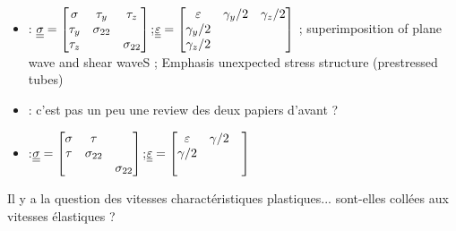 \begin{itemize}
\item \cite{Ting69}:  ${\underline{\underline{\sigma}}}=\left[\begin{matrix}\sigma & \tau_y & \tau_z\\ \tau_y & \sigma_{22} & \\\tau_z & & \sigma_{22}\end{matrix}\right]$;${\underline{\underline{\varepsilon}}}=\left[\begin{matrix}\varepsilon & \gamma_y/2 & \gamma_z/2\\ \gamma_y/2 &  & \\ \gamma_z/2& & \end{matrix}\right]$ ; superimposition of plane wave and shear waveS ; Emphasis unexpected stress structure (prestressed tubes)
\item \cite{Ting73}: c'est pas un peu une review des deux papiers d'avant ?
\item \cite{Li_planeStress_EP}:${\underline{\underline{\sigma}}}=\left[\begin{matrix}\sigma & \tau & \\ \tau & \sigma_{22} & \\ & & \sigma_{22}\end{matrix}\right]$;${\underline{\underline{\varepsilon}}}=\left[\begin{matrix}\varepsilon & \gamma/2 & \\ \gamma/2 &  & \\ & & \end{matrix}\right]$
\end{itemize}

Il y a la question des vitesses charactéristiques plastiques... sont-elles collées aux vitesses élastiques ?





